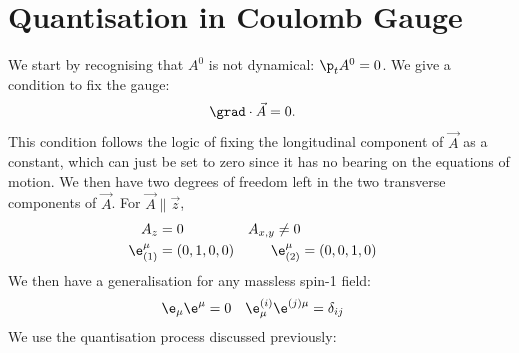 \documentclass[a4paper, 11pt, normalem]{report}
\begin{document}
\section{Quantisation in Coulomb Gauge}
We start by recognising that $A^0$ is not dynamical: $\p_t A^0 = 0$.
We give a condition to fix the gauge:
\begin{align}
    \grad\cdot\vec{A}&= 0.
\end{align}
This condition follows the logic of fixing the longitudinal component of $\vec{A}$ as a constant, which can just be set to zero since it has no bearing on the equations of motion. 
We then have two degrees of freedom left in the two transverse components of $\vec{A}$.
For $\vec{A}\parallel\vec{z}$,
\begin{align}
    A_z &= 0 & A_{x,y} \neq 0 \\
    \e_{(1)}^\mu &= (0,1,0,0) & \e_{(2)}^\mu &= (0,0,1,0)
\end{align}
We then have a generalisation for any massless spin-1 field:
\begin{align}
    \e_\mu\e^\mu &= 0 & \e_\mu^{(i)}\e^{(j)\mu} &= \delta_{ij}
\end{align}
We use the quantisation process discussed previously:
\end{document}
